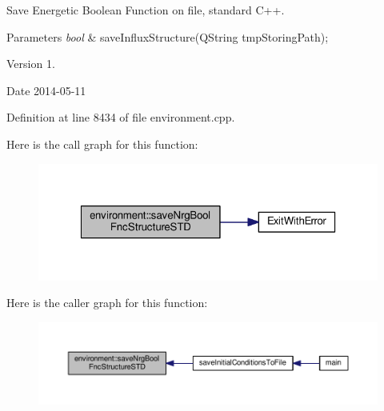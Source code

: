 Save Energetic Boolean Function on file, standard C++. 


\begin{DoxyParams}{Parameters}
{\em bool} & save\-Influx\-Structure(\-Q\-String tmp\-Storing\-Path); \\
\hline
\end{DoxyParams}
\begin{DoxyVersion}{Version}
1. 
\end{DoxyVersion}
\begin{DoxyDate}{Date}
2014-\/05-\/11 
\end{DoxyDate}


Definition at line 8434 of file environment.\-cpp.



Here is the call graph for this function\-:\nopagebreak
\begin{figure}[H]
\begin{center}
\leavevmode
\includegraphics[width=320pt]{a00011_a1412b9b1c3bd3e42bcb481f5e18ea931_cgraph}
\end{center}
\end{figure}




Here is the caller graph for this function\-:\nopagebreak
\begin{figure}[H]
\begin{center}
\leavevmode
\includegraphics[width=350pt]{a00011_a1412b9b1c3bd3e42bcb481f5e18ea931_icgraph}
\end{center}
\end{figure}


